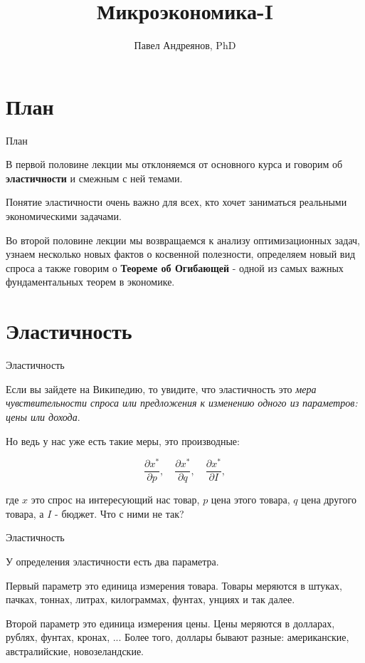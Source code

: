 \documentclass{beamer}
\title{
Микроэкономика-I
}
\author{
Павел Андреянов, PhD
}
\begin{document}
\maketitle

\section{План}

\begin{frame}{План}

В первой половине лекции мы отклоняемся от основного курса и говорим об  \textbf{эластичности} и смежным с ней темами. 

Понятие эластичности очень важно для всех, кто хочет заниматься реальными экономическими задачами.

Во второй половине лекции мы возвращаемся к анализу оптимизационных задач, узнаем несколько новых фактов о косвенной полезности, определяем новый вид спроса а также говорим о \textbf{Теореме об Огибающей} - одной из самых важных фундаментальных теорем в экономике.

\end{frame}


\section{Эластичность}

\begin{frame}{Эластичность}

Если вы зайдете на Википедию, то увидите, что эластичность это \textit{мера чувствительности спроса или предложения к изменению одного из параметров: цены или дохода}. 

Но ведь у нас уже есть такие меры, это производные:

$$\frac{\partial x^{\ast}}{\partial p}, \quad \frac{\partial x^{\ast}}{\partial q}, \quad \frac{\partial x^{\ast}}{\partial I},$$

где $x$ это спрос на интересующий нас товар, $p$ цена этого товара, $q$ цена другого товара, а $I$ - бюджет. Что с ними не так?

\end{frame}

\begin{frame}{Эластичность}

У определения эластичности есть два параметра. 

Первый параметр это единица измерения товара. Товары меряются в штуках, пачках, тоннах, литрах, килограммах, фунтах, унциях и так далее. 

Второй параметр это единица измерения цены. Цены меряются в долларах, рублях, фунтах, кронах, ... Более того, доллары бывают разные: американские, австралийские, новозеландские. 

\end{frame}
\end{document}
